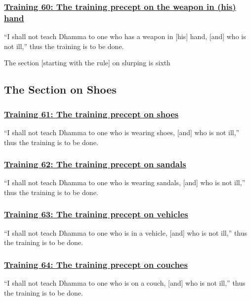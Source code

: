 \subsubsection*{\hyperref[sekh60]{Training 60: The training precept on the weapon in (his) hand}}
\label{training60}
``I shall not teach Dhamma to one who has a weapon in [his] hand, [and] who is not ill,'' thus the training is to be done.

\begin{center}
	The section [starting with the rule] on slurping is sixth
\end{center}



\setsubsecheadstyle{\subsectionFmt}
\subsection{The Section on Shoes}

\subsubsection*{\hyperref[sekh61]{Training 61: The training precept on shoes}}
\label{training61}
``I shall not teach Dhamma to one who is wearing shoes, [and] who is not ill,'' thus the training is to be done.



\subsubsection*{\hyperref[sekh62]{Training 62: The training precept on sandals}}
\label{training62}
``I shall not teach Dhamma to one who is wearing sandals, [and] who is not ill,'' thus the training is to be done.



\subsubsection*{\hyperref[sekh63]{Training 63: The training precept on vehicles}}
\label{training63}
``I shall not teach Dhamma to one who is in a vehicle, [and] who is not ill,'' thus the training is to be done.



\subsubsection*{\hyperref[sekh64]{Training 64: The training precept on couches}}
\label{training64}
``I shall not teach Dhamma to one who is on a couch, [and] who is not ill,'' thus the training is to be done.



